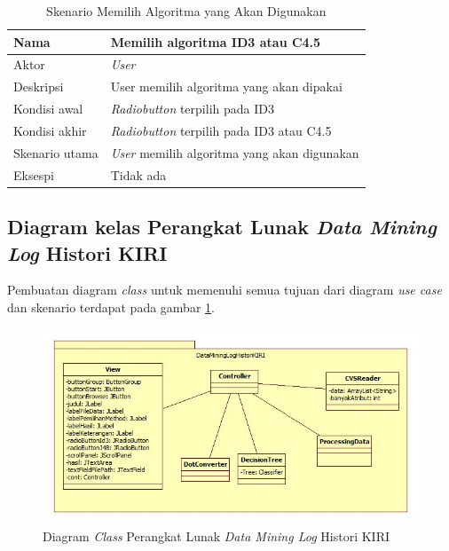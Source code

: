 \begin{table}[H]
\caption{Skenario Memilih Algoritma yang Akan Digunakan}
\begin{tabular}{|l|l|}
\hline
Nama           & Memilih algoritma ID3 atau C4.5                     \\ \hline
Aktor          & \textit{User}                                       \\ \hline
Deskripsi      & User memilih algoritma yang akan dipakai            \\ \hline
Kondisi awal   & \textsl{Radiobutton} terpilih pada ID3              \\ \hline
Kondisi akhir  & \textsl{Radiobutton} terpilih pada ID3 atau C4.5    \\ \hline
Skenario utama & \textit{User} memilih algoritma yang akan digunakan \\ \hline
Eksespi        & Tidak ada																					 \\ \hline
\end{tabular}
\end{table}


\subsection{Diagram kelas Perangkat Lunak \textsl{Data Mining Log} Histori KIRI}

Pembuatan diagram \textsl{class} untuk memenuhi semua tujuan dari diagram \textsl{use case} dan skenario terdapat pada gambar \ref{fig:classDiagram}.

\begin{figure}[h]
\includegraphics[scale=0.8]{Gambar/classdiagram.jpg}
\caption[Diagram \textsl{Class} Perangkat Lunak \textsl{Data Mining Log} Histori KIRI]{Diagram \textsl{Class} Perangkat Lunak \textsl{Data Mining Log} Histori KIRI} 
\label{fig:classDiagram}
\end{figure}

